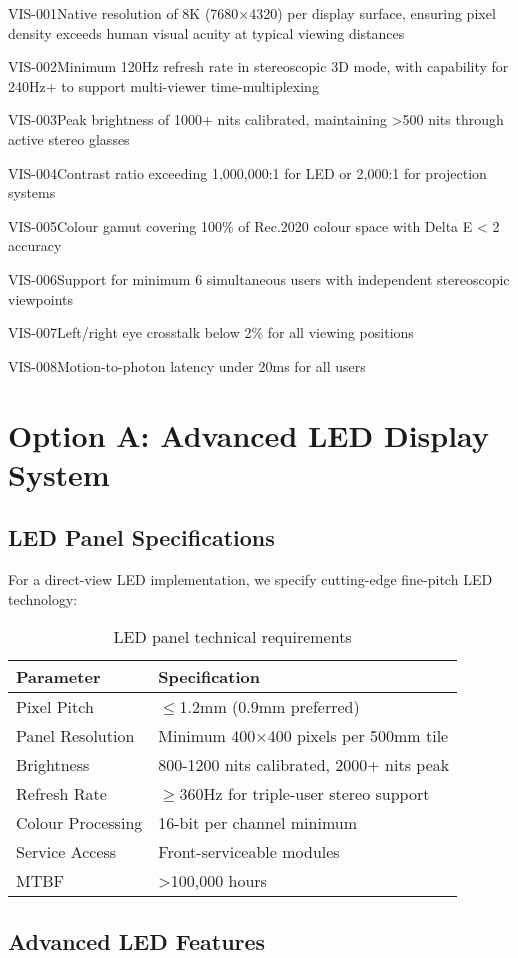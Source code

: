 \begin{requirement}{VIS-001}{Native resolution of 8K (7680×4320) per display surface, ensuring pixel density exceeds human visual acuity at typical viewing distances}
\begin{requirement}{VIS-002}{Minimum 120Hz refresh rate in stereoscopic 3D mode, with capability for 240Hz+ to support multi-viewer time-multiplexing}
\begin{requirement}{VIS-003}{Peak brightness of 1000+ nits calibrated, maintaining >500 nits through active stereo glasses}
\begin{requirement}{VIS-004}{Contrast ratio exceeding 1,000,000:1 for LED or 2,000:1 for projection systems}
\begin{requirement}{VIS-005}{Colour gamut covering 100\% of Rec.2020 colour space with Delta E < 2 accuracy}
\begin{requirement}{VIS-006}{Support for minimum 6 simultaneous users with independent stereoscopic viewpoints}
\begin{requirement}{VIS-007}{Left/right eye crosstalk below 2\% for all viewing positions}
\begin{requirement}{VIS-008}{Motion-to-photon latency under 20ms for all users}
\section{Option A: Advanced LED Display System}

\subsection{LED Panel Specifications}

For a direct-view LED implementation, we specify cutting-edge fine-pitch LED technology:

\begin{table}[H]
\centering
\begin{tabularx}{\textwidth}{@{}lX@{}}
\toprule
\textbf{Parameter} & \textbf{Specification} \\
\midrule
Pixel Pitch & $\le$1.2mm (0.9mm preferred) \\
Panel Resolution & Minimum 400×400 pixels per 500mm tile \\
Brightness & 800-1200 nits calibrated, 2000+ nits peak \\
Refresh Rate & $\ge$360Hz for triple-user stereo support \\
Colour Processing & 16-bit per channel minimum \\
Service Access & Front-serviceable modules \\
MTBF & >100,000 hours \\
\bottomrule
\end{tabularx}
\caption{LED panel technical requirements}
\end{table}

\subsection{Advanced LED Features}


\end{requirement}
\end{requirement}
\end{requirement}
\end{requirement}
\end{requirement}
\end{requirement}
\end{requirement}
\end{requirement}
